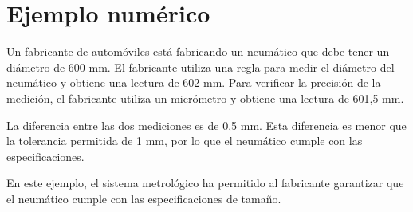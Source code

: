 \documentclass{article}
\theoremstyle{mytheoremstyle}
\theoremstyle{mytheoremstyle}
\theoremstyle{myproblemstyle}
\begin{document}
\section{Ejemplo numérico}


Un fabricante de automóviles está fabricando un neumático que debe tener un diámetro de 600 mm. El fabricante utiliza una regla para medir el diámetro del neumático y obtiene una lectura de 602 mm. Para verificar la precisión de la medición, el fabricante utiliza un micrómetro y obtiene una lectura de 601,5 mm.

La diferencia entre las dos mediciones es de 0,5 mm. Esta diferencia es menor que la tolerancia permitida de 1 mm, por lo que el neumático cumple con las especificaciones.

En este ejemplo, el sistema metrológico ha permitido al fabricante garantizar que el neumático cumple con las especificaciones de tamaño.

\nocite{*}

\end{document}
